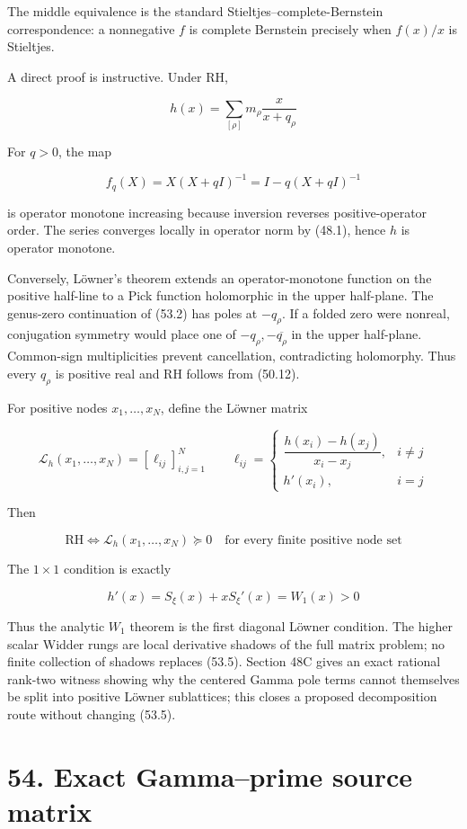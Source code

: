 \documentclass[
  11pt,
]{book}
\begin{document}
The middle equivalence is the standard Stieltjes--complete-Bernstein
correspondence: a nonnegative \(f\) is complete Bernstein precisely when
\(f(x)/x\) is Stieltjes.

A direct proof is instructive. Under RH,

\[
h(x)=\sum_{[\rho]}m_\rho\frac{x}{x+q_\rho}
\tag{53.2}
\]

For \(q>0\), the map

\[
f_q(X)=X(X+qI)^{-1}=I-q(X+qI)^{-1}
\tag{53.3}
\]

is operator monotone increasing because inversion reverses
positive-operator order. The series converges locally in operator norm
by (48.1), hence \(h\) is operator monotone.

Conversely, Löwner's theorem extends an operator-monotone function on
the positive half-line to a Pick function holomorphic in the upper
half-plane. The genus-zero continuation of (53.2) has poles at
\(-q_\rho\). If a folded zero were nonreal, conjugation symmetry would
place one of \(-q_\rho,-\overline{q_\rho}\) in the upper half-plane.
Common-sign multiplicities prevent cancellation, contradicting
holomorphy. Thus every \(q_\rho\) is positive real and RH follows from
(50.12).

For positive nodes \(x_1,\ldots,x_N\), define the Löwner matrix

\[
\mathcal L_h(x_1,\ldots,x_N)
=\left[\ell_{ij}\right]_{i,j=1}^N
\qquad
\ell_{ij}=
\begin{cases}
\dfrac{h(x_i)-h(x_j)}{x_i-x_j},&i\ne j\\[2mm]
h'(x_i),&i=j
\end{cases}
\tag{53.4}
\]

Then

\[
\boxed{
\mathrm{RH}
\iff
\mathcal L_h(x_1,\ldots,x_N)\succeq0
\quad\text{for every finite positive node set}}
\tag{53.5}
\]

The \(1\times1\) condition is exactly

\[
h'(x)=S_\xi(x)+xS_\xi'(x)=W_1(x)>0
\tag{53.6}
\]

Thus the analytic \(W_1\) theorem is the first diagonal Löwner
condition. The higher scalar Widder rungs are local derivative shadows
of the full matrix problem; no finite collection of shadows replaces
(53.5). Section 48C gives an exact rational rank-two witness showing why
the centered Gamma pole terms cannot themselves be split into positive
Löwner sublattices; this closes a proposed decomposition route without
changing (53.5).

\section{54. Exact Gamma--prime source
matrix}\label{exact-gammaprime-source-matrix}
\end{document}

